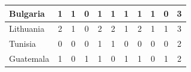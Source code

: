 \documentclass[12pt]{article}  %
\begin{document}
\begin{subappendices}
\begin{longtable}{|l|c|c|c|c|c|c|c|c|c|c|}
	\hline
	Bulgaria                                                       & 1                                                                      & 1                                                                      & 0                                                                      & 1                                                                      & 1                                                                      & 1                                                                      & 1                         & 1                           & 0                           & 3                           \\ 
	\hline
	Lithuania                                                      & 2                                                                      & 1                                                                      & 0                                                                      & 2                                                                      & 2                                                                      & 1                                                                      & 2                         & 1                           & 1                           & 3                           \\ 
	\hline
	Tunisia                                                        & 0                                                                      & 0                                                                      & 0                                                                      & 1                                                                      & 1                                                                      & 0                                                                      & 0                         & 0                           & 0                           & 2                           \\ 
	\hline
	Guatemala                                                      & 1                                                                      & 0                                                                      & 1                                                                      & 1                                                                      & 0                                                                      & 1                                                                      & 1                         & 0                           & 1                           & 2                           \\ 

\end{longtable}
\end{subappendices}
\end{document}
